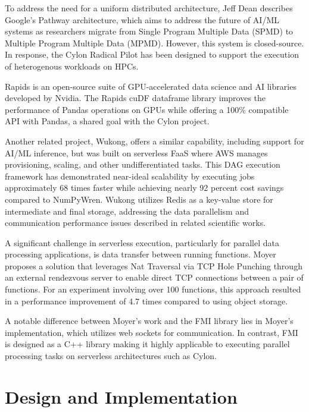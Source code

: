 \documentclass[conference]{IEEEtran}
\begin{document}
To address the need for a uniform distributed architecture, Jeff Dean describes Google’s Pathway architecture, which aims to address the future of AI/ML systems as researchers migrate from Single Program Multiple Data (SPMD) to Multiple Program Multiple Data (MPMD). However, this system is closed-source.  In response, the Cylon Radical Pilot has been designed to support the execution of heterogenous workloads on HPCs. \cite{sarker2024radical}

Rapids is an open-source suite of GPU-accelerated data science and AI libraries developed by Nvidia. The Rapids cuDF dataframe library improves the performance of Pandas operations on GPUs while offering a 100\% compatible API with Pandas, a shared goal with the Cylon project\cite{RAPIDScuDF}.


Another related project, Wukong, offers a similar capability, including support for AI/ML inference, but was built on serverless FaaS where AWS manages provisioning, scaling, and other undifferentiated tasks. This DAG execution framework has demonstrated near-ideal scalability by executing jobs approximately 68 times faster while achieving nearly 92 percent cost savings compared to NumPyWren. Wukong utilizes Redis as a key-value store for intermediate and final storage, addressing the data parallelism and communication performance issues described in related scientific works\cite{carver2020wukong}.

A significant challenge in serverless execution, particularly for parallel data processing applications, is data transfer between running functions. Moyer proposes a solution that leverages Nat Traversal via TCP Hole Punching through an external rendezvous server to enable direct TCP connections between a pair of functions. For an experiment involving over 100 functions, this approach resulted in a performance improvement of 4.7 times compared to using object storage. \cite{moyer2021punching}

A notable difference between Moyer’s work and the FMI library lies in Moyer’s implementation, which utilizes web sockets for communication. In contrast, FMI is designed as a C++ library making it highly applicable to executing parallel processing tasks on serverless architectures such as Cylon. 


\section{Design and Implementation}
\label{sec:design}
\end{document}

